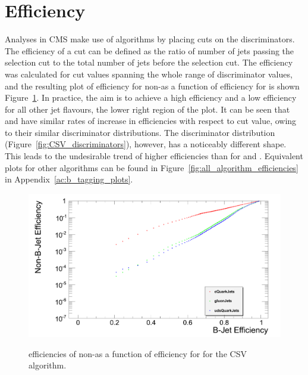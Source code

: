 \section{Efficiency}
\label{s:efficiency}

Analyses in CMS make use of \btagging algorithms by placing cuts on the discriminators. The efficiency of a
cut can be defined as the ratio of number of jets passing the selection cut to the total number of jets before
the selection cut. The efficiency was calculated for cut values spanning the whole range of discriminator
values, and the resulting plot of \btagging efficiency for non-\bjets as a function of \btagging efficiency
for \bjets is shown Figure~\ref{fig:CSV_jet_efficiencies}. In practice, the aim is to achieve a high \bjet
efficiency and a low efficiency for all other jet flavours, \ie the lower right region of the plot. It can be
seen that \udsjets and \gjets have similar rates of increase in efficiencies with respect to cut value, owing
to their similar discriminator distributions. The \cjet discriminator distribution
(Figure~\ref{fig:CSV_discriminators}), however, has a noticeably different shape. This leads to the
undesirable trend of higher \cjet efficiencies than for \udsjets and \gjets. Equivalent plots for other
algorithms can be found in Figure~\ref{fig:all_algorithm_efficiencies} in Appendix~\ref{ac:b_tagging_plots}.

\begin{figure}[hbtp]
   \centering
     \includegraphics[width=\textwidth]{Chapters/06_BTag_Study/Images/CombinedSecondaryVertex_nonBJetEfficiency_v_bJetEfficiency}\\
     \caption[\btagging efficiencies of non-\bjets as a function of \btagging efficiency for \bjets for the
     CSV algorithm.]{\btagging efficiencies of non-\bjets as a function of \btagging efficiency for \bjets for
     the CSV algorithm.}
     \label{fig:CSV_jet_efficiencies}
\end{figure}

